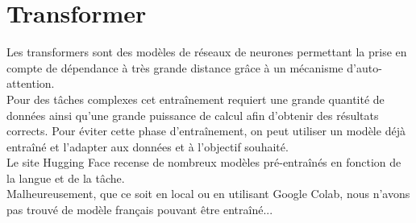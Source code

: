 \section{Transformer}
Les transformers sont des modèles de réseaux de neurones permettant la prise en compte de dépendance à très grande distance grâce à un mécanisme d'auto-attention.\\
Pour des tâches complexes cet entraînement requiert une grande quantité de données ainsi qu'une grande puissance de calcul afin d'obtenir des résultats corrects. Pour éviter cette phase d'entraînement, on peut utiliser un modèle déjà entraîné et l'adapter aux données et à l'objectif souhaité.\\
Le site Hugging Face \cite{hugging_face} recense de nombreux modèles pré-entraînés en fonction de la langue et de la tâche.\\
Malheureusement, que ce soit en local ou en utilisant Google Colab, nous n'avons pas trouvé de modèle français pouvant être entraîné...